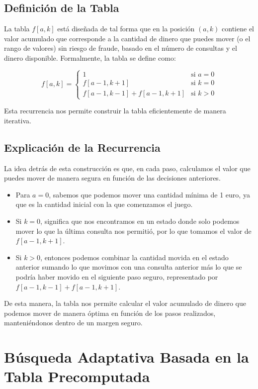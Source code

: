 \documentclass{article}
\begin{document}
\subsection{Definición de la Tabla}
La tabla $f[a, k]$ está diseñada de tal forma que en la posición $(a, k)$ contiene el valor acumulado que corresponde a la cantidad de dinero que puedes mover (o el rango de valores) sin riesgo de fraude, basado en el número de consultas y el dinero disponible. Formalmente, la tabla se define como:

\[
f[a, k] = 
\begin{cases} 
1 & \text{si } a = 0 \\
f[a-1, k+1] & \text{si } k = 0 \\
f[a-1, k-1] + f[a-1, k+1] & \text{si } k > 0
\end{cases}
\]

Esta recurrencia nos permite construir la tabla eficientemente de manera iterativa.

\subsection{Explicación de la Recurrencia}
La idea detrás de esta construcción es que, en cada paso, calculamos el valor que puedes mover de manera segura en función de las decisiones anteriores. 

\begin{itemize}
    \item Para $a=0$, sabemos que podemos mover una cantidad mínima de 1 euro, ya que es la cantidad inicial con la que comenzamos el juego.
    \item Si $k = 0$, significa que nos encontramos en un estado donde solo podemos mover lo que la última consulta nos permitió, por lo que tomamos el valor de $f[a-1, k+1]$.
    \item Si $k > 0$, entonces podemos combinar la cantidad movida en el estado anterior sumando lo que movimos con una consulta anterior más lo que se podría haber movido en el siguiente paso seguro, representado por $f[a-1, k-1] + f[a-1, k+1]$.
\end{itemize}

De esta manera, la tabla nos permite calcular el valor acumulado de dinero que podemos mover de manera óptima en función de los pasos realizados, manteniéndonos dentro de un margen seguro.
\section{Búsqueda Adaptativa Basada en la Tabla Precomputada}
\end{document}
